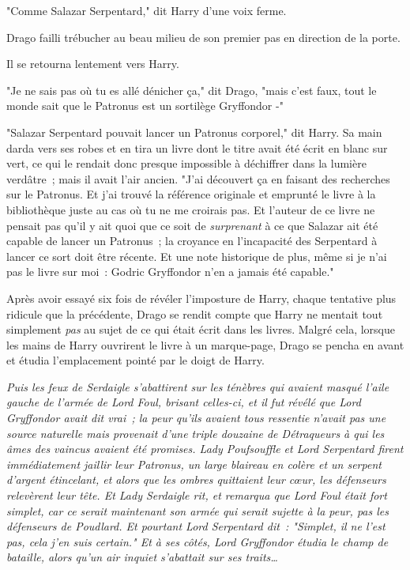 "Comme Salazar Serpentard," dit Harry d'une voix ferme.

Drago failli trébucher au beau milieu de son premier pas en direction de la porte.

Il se retourna lentement vers Harry.

"Je ne sais pas où tu es allé dénicher ça," dit Drago, "mais c'est faux, tout le monde sait que le Patronus est un sortilège Gryffondor -"

"Salazar Serpentard pouvait lancer un Patronus corporel," dit Harry. Sa main darda vers ses robes et en tira un livre dont le titre avait été écrit en blanc sur vert, ce qui le rendait donc presque impossible à déchiffrer dans la lumière verdâtre~; mais il avait l'air ancien. "J'ai découvert ça en faisant des recherches sur le Patronus. Et j'ai trouvé la référence originale et emprunté le livre à la bibliothèque juste au cas où tu ne me croirais pas. Et l'auteur de ce livre ne pensait pas qu'il y ait quoi que ce soit de \emph{surprenant} à ce que Salazar ait été capable de lancer un Patronus~; la croyance en l'incapacité des Serpentard à lancer ce sort doit être récente. Et une note historique de plus, même si je n'ai pas le livre sur moi~: Godric Gryffondor n'en a jamais été capable."

Après avoir essayé six fois de révéler l'imposture de Harry, chaque tentative plus ridicule que la précédente, Drago se rendit compte que Harry ne mentait tout simplement \emph{pas} au sujet de ce qui était écrit dans les livres. Malgré cela, lorsque les mains de Harry ouvrirent le livre à un marque-page, Drago se pencha en avant et étudia l'emplacement pointé par le doigt de Harry.

\emph{Puis les feux de Serdaigle s'abattirent sur les ténèbres qui avaient masqué l'aile gauche de l'armée de Lord Foul, brisant celles-ci, et il fut révélé que Lord Gryffondor avait dit vrai~; la peur qu'ils avaient tous ressentie n'avait pas une source naturelle mais provenait d'une triple douzaine de Détraqueurs à qui les âmes des vaincus avaient été promises. Lady Poufsouffle et Lord Serpentard firent immédiatement jaillir leur Patronus, un large blaireau en colère et un serpent d'argent étincelant, et alors que les ombres quittaient leur cœur, les défenseurs relevèrent leur tête. Et Lady Serdaigle rit, et remarqua que Lord Foul était fort simplet, car ce serait maintenant son armée qui serait sujette à la peur, pas les défenseurs de Poudlard. Et pourtant Lord Serpentard dit~: "Simplet, il ne l'est pas, cela j'en suis certain." Et à ses côtés, Lord Gryffondor étudia le champ de bataille, alors qu'un air inquiet s'abattait sur ses traits…}

